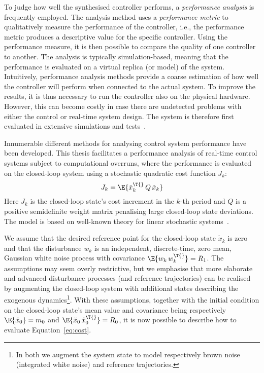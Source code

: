 To judge how well the synthesised controller performs, a \emph{performance analysis} is frequently employed.
The analysis method uses a \emph{performance metric} to qualitatively measure the performance of the controller, i.e., the performance metric produces a descriptive value for the specific controller.
Using the performance measure, it is then possible to compare the quality of one controller to another.
The analysis is typically simulation-based, meaning that the performance is evaluated on a virtual replica (or model) of the system.
Intuitively, performance analysis methods provide a coarse estimation of how well the controller will perform when connected to the actual system.
To improve the results, it is thus necessary to run the controller also on the physical hardware.
However, this can become costly in case there are undetected problems with either the control or real-time system design.
The system is therefore first evaluated in extensive simulations and tests~\cite{Mandrioli:2022}.

Innumerable different methods for analysing control system performance have been developed.
This thesis facilitates a performance analysis of real-time control systems subject to computational overruns, where the performance is evaluated on the closed-loop system using a stochastic quadratic cost function $J_k$:
%
\begin{equation}%
    \label{eq:cost}%
    J_k = \E{\tilde{x}_k^\T{}\, Q\, \tilde{x}_k}
\end{equation}
%
Here $J_k$ is the closed-loop state's cost increment in the $k$-th period and $Q$ is a positive semidefinite weight matrix penalising large closed-loop state deviations.
The model is based on well-known theory for linear stochastic systems~\cite{Astrom:1970, Astrom:1997, Cervin:2019}.

We assume that the desired reference point for the closed-loop state $\tilde{x}_k$ is zero and that the disturbance $w_k$ is an independent, discrete-time, zero mean, Gaussian white noise process with covariance $\E{w_k\,w_k^\T{}} = R_1$.
The assumptions may seem overly restrictive, but we emphasise that more elaborate and advanced disturbance processes (and reference trajectories) can be realised by augmenting the closed-loop system with additional states describing the exogenous dynamics\footnote{In both  we augment the system state to model respectively brown noise (integrated white noise) and reference trajectories.}.
With these assumptions, together with the initial condition on the closed-loop state's mean value and covariance being respectively $\E{\tilde{x}_0} = m_0$ and $\E{\tilde{x}_0\,\tilde{x}_0^\T{}} = R_0$, it is now possible to describe how to evaluate Equation~\eqref{eq:cost}.

